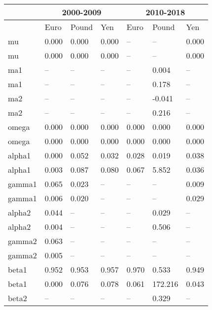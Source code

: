 \documentclass[12pt]{article}
\begin{document}
\begin{table}
	\fontsize{10pt}{10pt}\selectfont
	\begin{tabular}{l l l l | l l l }
		\midrule
				   & \multicolumn{3}{c}{2000-2009} & \multicolumn{3}{c}{2010-2018} \\
		\midrule
				   & Euro & Pound & Yen & Euro & Pound & Yen \\
		\midrule
            mu         & 0.000 & 0.000 &  0.000 &     -- &      -- & 0.000  \\
            mu         & 0.000 & 0.000 &  0.000 &     -- &      -- & 0.000  \\
           ma1         &    -- &    -- &     -- &     -- &   0.004 &    --  \\
           ma1         &    -- &    -- &     -- &     -- &   0.178 &    --  \\
           ma2         &    -- &    -- &     -- &     -- &  -0.041 &    --  \\
           ma2         &    -- &    -- &     -- &     -- &   0.216 &    --  \\
         omega         & 0.000 & 0.000 &  0.000 &  0.000 &   0.000 & 0.000  \\
         omega         & 0.000 & 0.000 &  0.000 &  0.000 &   0.000 & 0.000  \\
        alpha1         & 0.000 & 0.052 &  0.032 &  0.028 &   0.019 & 0.038  \\
        alpha1         & 0.003 & 0.087 &  0.080 &  0.067 &   5.852 & 0.036  \\
        gamma1         & 0.065 & 0.023 &     -- &     -- &      -- & 0.009  \\
        gamma1         & 0.006 & 0.020 &     -- &     -- &      -- & 0.029  \\
        alpha2         & 0.044 &    -- &     -- &     -- &   0.029 &    --  \\
        alpha2         & 0.004 &    -- &     -- &     -- &   0.506 &    --  \\
        gamma2         & 0.063 &    -- &     -- &     -- &      -- &    --  \\
        gamma2         & 0.005 &    -- &     -- &     -- &      -- &    --  \\
         beta1         & 0.952 & 0.953 &  0.957 &  0.970 &   0.533 & 0.949  \\
         beta1         & 0.000 & 0.076 &  0.078 &  0.061 & 172.216 & 0.043  \\
         beta2         &    -- &    -- &     -- &     -- &   0.329 &    --  \\

\end{tabular}
\end{table}
\end{document}
